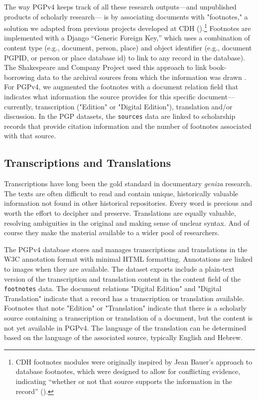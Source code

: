 \documentclass{article}
\begin{document}
The way PGPv4 keeps track of all these research outputs—and unpublished products of scholarly research— is by associating documents with "footnotes," a solution  we adapted from previous projects developed at CDH (\citeyear{koeser_princeton-cdhmep-django_2022, koeser_derrida-django_2021}).\footnote{CDH footnotes modules were originally inspired by Jean Bauer’s approach to database footnotes, which were designed to allow for conflicting evidence, indicating “whether or not that source supports the information in the record” (\citeyear{noauthor_tales_2012}).} Footnotes are implemented with a Django “Generic Foreign Key,” which uses a combination of content type (e.g., document, person, place) and object identifier (e.g., document PGPID, or person or place database id) to link to any record in the database). The Shakespeare and Company Project used this approach to link book-borrowing data to the archival sources from which the information was drawn \autocite[18]{kotin_shakespeare_2022}. For PGPv4, we augmented the footnotes with a document relation field that indicates what information the source provides for this specific document—currently, transcription ("Edition" or "Digital Edition"), translation and/or discussion. In the PGP datasets, the \texttt{sources} data are linked to scholarship records that provide citation information and the number of footnotes associated with that source.

\subsection{Transcriptions and Translations}
Transcriptions have long been the gold standard in documentary \textit{geniza }research. The texts are often difficult to read and  contain unique, historically valuable information not found in other historical repositories. Every word is precious and worth the effort to decipher and preserve. Translations are equally valuable, resolving ambiguities in the original and making sense of unclear syntax. And of course they make the material available to a wider pool of researchers.

The PGPv4 database stores and manages transcriptions and translations in the W3C annotation format with minimal HTML formatting. Annotations are linked to images when they are available. The dataset exports include a plain-text version of the transcription and translation content in the content field of the \texttt{footnotes} data. The document relations "Digital Edition" and "Digital Translation" indicate that a record has a  transcription or translation available. Footnotes that note "Edition" or "Translation" indicate that there is a scholarly source containing a transcription or translation of a document, but the content is not yet available in PGPv4. The language of the translation can be determined based on the language of the associated source, typically English and Hebrew.
\end{document}
